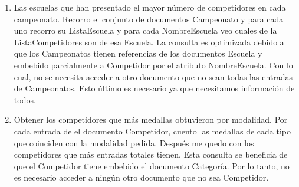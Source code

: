 \begin{enumerate}
\item Las escuelas que han presentado el mayor número de competidores en cada campeonato. Recorro el conjunto de documentos
Campeonato y para cada uno recorro su ListaEscuela y para cada NombreEscuela veo cuales de la ListaCompetidores son de esa
Escuela. La consulta es optimizada debido a que los Campeonatos tienen referencias de los documentos Escuela y embebido parcialmente
a Competidor por el atributo NombreEscuela. Con lo cual, no se necesita acceder a otro documento que no sean todas las
entradas de Campeonatos. Esto último es necesario ya que necesitamos información de todos.

\item Obtener los competidores que más medallas obtuvieron por modalidad. Por cada entrada de el documento Competidor,
cuento las medallas de cada tipo que coinciden con la modalidad pedida. Después me quedo con los competidores que más entradas
totales tienen. Esta consulta se beneficia de que el Competidor tiene embebido el documento Categoría. Por lo tanto, no es
necesario acceder a ningún otro documento que no sea Competidor.

\end{enumerate}
